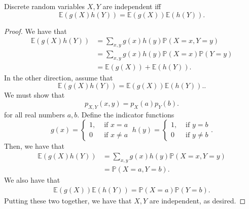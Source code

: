 \begin{theorem}
	Discrete random variables \( X,Y \) are independent iff \[
		\mathbb{E}(g(X)h(Y)) = \mathbb{E}(g(X))\mathbb{E}(h(Y))
	.\] 
\end{theorem}
\begin{proof}
	We have that 
	\begin{align*}
		\mathbb{E}(g(X)h(Y)) &=  \sum_{x,y} g(x)h(y)\mathbb{P}(X=x,Y=y) \\
		&= \sum_{x,y} g(x)h(y)\mathbb{P}(X=x)\mathbb{P}(Y=y) \\
		&= \mathbb{E}(g(X)) + \mathbb{E}(h(Y))
	.\end{align*}
	In the other direction, assume that \[
		\mathbb{E}(g(X)h(Y)) = \mathbb{E}(g(X))\mathbb{E}(h(Y)).
	.\] We must show that \[
		p_{X,Y}(x,y) = p_{X}(a)p_{Y}(b)
	.\] for all real numbers \( a,b \). Define the indicator functions \[
		g(x) = \begin{cases}
			1, &\text{ if }x=a\\
			0 &\text{ if }x\neq a
		\end{cases} ~ h(y) = \begin{cases}
			1, &\text{ if }y=b\\
			0 &\text{ if } y\neq b
		\end{cases}
	.\] Then, we have that 
	\begin{align*}
		\mathbb{E}(g(X)h(Y)) &= \sum_{x,y}g(x)h(y)\mathbb{P}(X=x,Y=y) \\
		&= \mathbb{P}(X=a,Y=b)
	.\end{align*}
	We also have that 
	\begin{align*}
		\mathbb{E}(g(X))\mathbb{E}(h(Y)) = \mathbb{P}(X=a)\mathbb{P}(Y=b)
	.\end{align*}
	Putting these two together, we have that \( X,Y \) are independent, as desired.
\end{proof}

